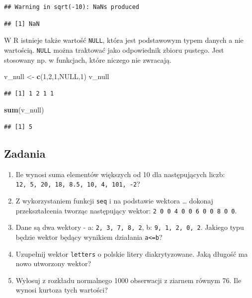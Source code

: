 \documentclass[]{book}
\newenvironment{Shaded}{\begin{snugshade}}{\end{snugshade}}
\newcommand{\KeywordTok}[1]{\textcolor[rgb]{0.13,0.29,0.53}{\textbf{#1}}}
\newcommand{\DecValTok}[1]{\textcolor[rgb]{0.00,0.00,0.81}{#1}}
\newcommand{\StringTok}[1]{\textcolor[rgb]{0.31,0.60,0.02}{#1}}
\newcommand{\OtherTok}[1]{\textcolor[rgb]{0.56,0.35,0.01}{#1}}
\newcommand{\NormalTok}[1]{#1}
\providecommand{\tightlist}{%
  \setlength{\itemsep}{0pt}\setlength{\parskip}{0pt}}
\begin{document}
\begin{verbatim}
## Warning in sqrt(-10): NaNs produced
\end{verbatim}

\begin{verbatim}
## [1] NaN
\end{verbatim}

W R istnieje także wartość \texttt{NULL}, która jest podstawowym typem
danych a nie wartością. \texttt{NULL} można traktować jako odpowiednik
zbioru pustego. Jest stosowany np. w funkcjach, które niczego nie
zwracają.

\begin{Shaded}
\begin{Highlighting}[]
\NormalTok{v_null <-}\StringTok{ }\KeywordTok{c}\NormalTok{(}\DecValTok{1}\NormalTok{,}\DecValTok{2}\NormalTok{,}\DecValTok{1}\NormalTok{,}\OtherTok{NULL}\NormalTok{,}\DecValTok{1}\NormalTok{)}
\NormalTok{v_null}
\end{Highlighting}
\end{Shaded}

\begin{verbatim}
## [1] 1 2 1 1
\end{verbatim}

\begin{Shaded}
\begin{Highlighting}[]
\KeywordTok{sum}\NormalTok{(v_null)}
\end{Highlighting}
\end{Shaded}

\begin{verbatim}
## [1] 5
\end{verbatim}

\subsection{Zadania}\label{zadania}

\begin{enumerate}
\def\labelenumi{\arabic{enumi}.}
\tightlist
\item
  Ile wynosi suma elementów większych od 10 dla następujących liczb:
  \texttt{12,\ 5,\ 20,\ 18,\ 8.5,\ 10,\ 4,\ 101,\ -2}?
\item
  Z wykorzystaniem funkcji \texttt{seq} i na podstawie wektora \ldots{}
  dokonaj przekształcenia tworząc następujący wektor:
  \texttt{2\ 0\ 0\ 4\ 0\ 0\ 6\ 0\ 0\ 8\ 0\ 0}.
\item
  Dane są dwa wektory - a: \texttt{2,\ 3,\ 7,\ 8,\ 2}, b:
  \texttt{9,\ 1,\ 2,\ 0,\ 2}. Jakiego typu będzie wektor będący wynikiem
  działania \texttt{a\textless{}=b}?
\item
  Uzupełnij wektor \texttt{letters} o polskie litery diakrytyzowane.
  Jaką długość ma nowo utworzony wektor?
\item
  Wylosuj z rozkładu normalnego 1000 obserwacji z ziarnem równym 76. Ile
  wynosi kurtoza tych wartości?
\end{enumerate}
\end{document}
